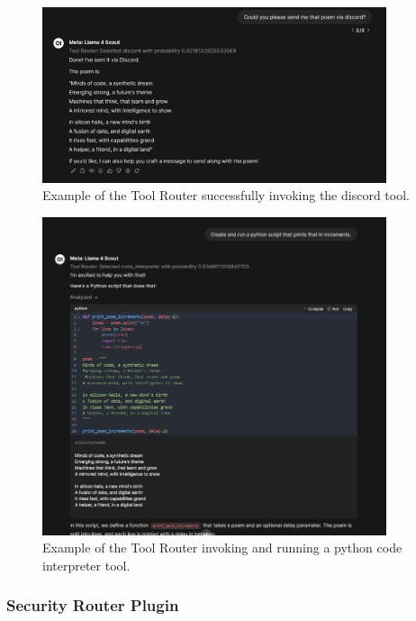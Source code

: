 \begin{figure}[H]
    \centering
    \includegraphics[width=0.9\textwidth]{figures/owui-tool-demo-1.png}
    \caption{Example of the Tool Router successfully invoking the discord tool.}
    \label{fig:tool_router_plugin_demo_1}
\end{figure}

\begin{figure}[H]
    \centering
    \includegraphics[width=0.9\textwidth]{figures/owui-tool-demo-2.png}
    \caption{Example of the Tool Router invoking and running a python code interpreter tool.}
    \label{fig:tool_router_plugin_demo_2}
\end{figure}


\subsubsection{Security Router Plugin}

